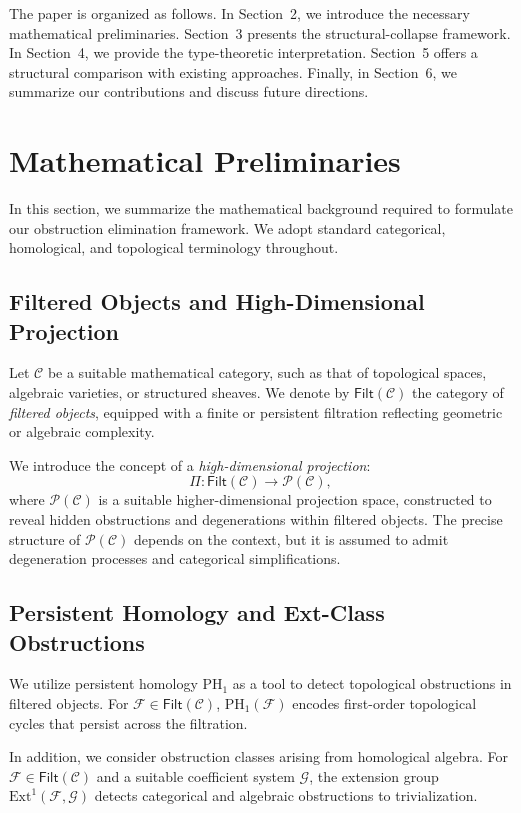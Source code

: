 \documentclass[11pt]{article}
\begin{document}
The paper is organized as follows. In Section~2, we introduce the necessary mathematical preliminaries. Section~3 presents the structural-collapse framework. In Section~4, we provide the type-theoretic interpretation. Section~5 offers a structural comparison with existing approaches. Finally, in Section~6, we summarize our contributions and discuss future directions.


\section{Mathematical Preliminaries}

In this section, we summarize the mathematical background required to formulate our obstruction elimination framework. We adopt standard categorical, homological, and topological terminology throughout.

\subsection{Filtered Objects and High-Dimensional Projection}

Let $\mathcal{C}$ be a suitable mathematical category, such as that of topological spaces, algebraic varieties, or structured sheaves. We denote by $\mathsf{Filt}(\mathcal{C})$ the category of \emph{filtered objects}, equipped with a finite or persistent filtration reflecting geometric or algebraic complexity.

We introduce the concept of a \emph{high-dimensional projection}:
\[
\Pi : \mathsf{Filt}(\mathcal{C}) \longrightarrow \mathcal{P}(\mathcal{C}),
\]
where $\mathcal{P}(\mathcal{C})$ is a suitable higher-dimensional projection space, constructed to reveal hidden obstructions and degenerations within filtered objects. The precise structure of $\mathcal{P}(\mathcal{C})$ depends on the context, but it is assumed to admit degeneration processes and categorical simplifications.

\subsection{Persistent Homology and Ext-Class Obstructions}

We utilize persistent homology $\mathrm{PH}_1$ as a tool to detect topological obstructions in filtered objects. For $\mathcal{F} \in \mathsf{Filt}(\mathcal{C})$, $\mathrm{PH}_1(\mathcal{F})$ encodes first-order topological cycles that persist across the filtration.

In addition, we consider obstruction classes arising from homological algebra. For $\mathcal{F} \in \mathsf{Filt}(\mathcal{C})$ and a suitable coefficient system $\mathcal{G}$, the extension group $\mathrm{Ext}^1(\mathcal{F}, \mathcal{G})$ detects categorical and algebraic obstructions to trivialization.
\end{document}
